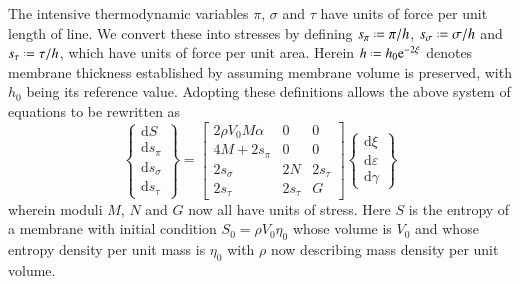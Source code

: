 The intensive thermo\-dynamic variables $\pi$, $\sigma$ and $\tau$ have units of force per unit length of line.  We convert these into stresses by defining $s_{\pi} \defeq \pi / h$, $s_{\sigma} \defeq \sigma / h$ and $s_{\tau} \defeq \tau / h$, which have units of force per unit area.  Herein $h \defeq h_0 \mathrm{e}^{-2\xi}$ denotes membrane thickness established by assuming membrane volume is preserved, with $h_0$ being its reference value.  Adopting these definitions allows the above system of equations to be rewritten as
\begin{equation}
\left\{ \begin{matrix}
\mathrm{d} S \\ \mathrm{d} s_{\pi} \\ 
\mathrm{d} s_{\sigma} \\ \mathrm{d} s_{\tau}
\end{matrix} \right\} = \begin{bmatrix}
2 \rho V_0 M \alpha & 0 & 0 \\
4 M + 2 s_{\pi} & 0 & 0 \\
2 s_{\sigma} & 2 N & 2 s_{\tau} \\
2 s_{\tau} & 2 s_{\tau} & G
\end{bmatrix} \left\{ \begin{matrix}
\mathrm{d} \xi \\ \mathrm{d} \varepsilon \\ \mathrm{d} \gamma
\end{matrix} \right\}
\end{equation}
wherein moduli $M$, $N$ and $G$ now all have units of stress.  Here $S$ is the entropy of a membrane with initial condition $S_0 = \rho V_0 \eta_0$ whose volume is $V_0$ and whose entropy density per unit mass is $\eta_0$ with $\rho$ now describing mass density per unit volume.

